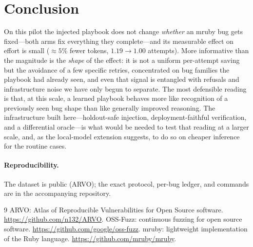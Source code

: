 \documentclass[11pt]{article}
\begin{document}
\section{Conclusion}

On this pilot the injected playbook does not change \emph{whether} an mruby bug
gets fixed---both arms fix everything they complete---and its measurable effect on
effort is small ($\approx 5\%$ fewer tokens, $1.19\!\rightarrow\!1.00$
attempts). More informative than the magnitude is the \emph{shape} of the effect:
it is not a uniform per-attempt saving but the avoidance of a few specific retries,
concentrated on bug families the playbook had already seen, and even that signal is
entangled with refusals and infrastructure noise we have only begun to separate.
The most defensible reading is that, at this scale, a learned playbook behaves more
like recognition of a previously seen bug shape than like generally improved
reasoning. The infrastructure built here---holdout-safe injection, deployment-faithful
verification, and a differential oracle---is what would be needed to test that
reading at a larger scale, and, as the local-model extension suggests, to do so on
cheaper inference for the routine cases.

\paragraph{Reproducibility.} The dataset is public (ARVO); the exact protocol,
per-bug ledger, and commands are in the accompanying repository.

\begin{thebibliography}{9}
 ARVO: Atlas of Reproducible Vulnerabilities for Open Source
software. \url{https://github.com/n132/ARVO}.
 OSS-Fuzz: continuous fuzzing for open source software.
\url{https://github.com/google/oss-fuzz}.
 mruby: lightweight implementation of the Ruby language.
\url{https://github.com/mruby/mruby}.
\end{thebibliography}
\end{document}
